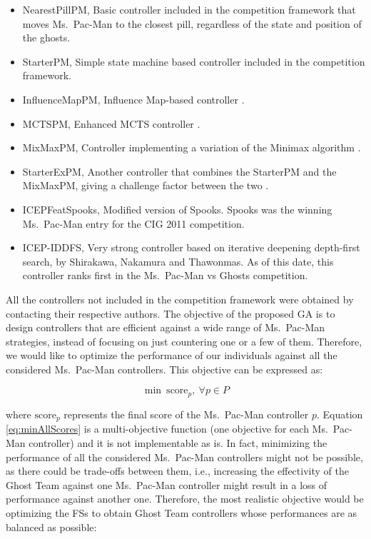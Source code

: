 \documentclass[journal]{IEEEtran}
\begin{document}
\begin{itemize}
  \item NearestPillPM, Basic controller included in the competition framework that moves Ms.\  Pac-Man to the closest pill, regardless of the state and position of the ghosts.
  \item StarterPM, Simple state machine based controller included in the competition framework.
  \item InfluenceMapPM, Influence Map-based controller \cite{Svensson2012}.
  \item MCTSPM, Enhanced MCTS controller \cite{Pepels2012}.
  \item MixMaxPM, Controller implementing a variation of the Minimax algorithm \cite{Cardona13}.
  \item StarterExPM, Another controller that combines the StarterPM and the MixMaxPM, giving a challenge factor between the two \cite{Cardona13}.
  \item ICEPFeatSpooks, Modified version of Spooks. Spooks was the winning Ms.\  Pac-Man entry for the CIG 2011 competition.
  \item ICEP-IDDFS, Very strong controller based on iterative deepening depth-first search, by Shirakawa, Nakamura and Thawonmas. As of this date, this controller ranks first in the Ms.\  Pac-Man vs Ghosts competition.
\end{itemize}

All the controllers not included in the competition framework were obtained by contacting their respective authors. The objective of the proposed GA is to design controllers that are efficient against a wide range of Ms.\  Pac-Man strategies, instead of focusing on just countering one or a few of them. Therefore, we would like to optimize the performance of our individuals against all the considered Ms.\  Pac-Man controllers. This objective can be expressed as:

\begin{equation}
\label{eq:minAllScores}
	\min \: \text{score}_p, \: \forall p \in P
\end{equation}

where $\text{score}_p$ represents the final score of the Ms.\  Pac-Man controller $p$. Equation \eqref{eq:minAllScores} is a multi-objective function (one objective for each Ms.\  Pac-Man controller) and it is not implementable as is. In fact, minimizing the performance of all the considered Ms.\  Pac-Man controllers might not be possible, as there could be trade-offs between them, i.e., increasing the effectivity of the Ghost Team against one Ms.\  Pac-Man controller might result in a loss of performance against another one. Therefore, the most realistic objective would be optimizing the FSs to obtain Ghost Team controllers whose performances are as balanced as possible:
\end{document}
